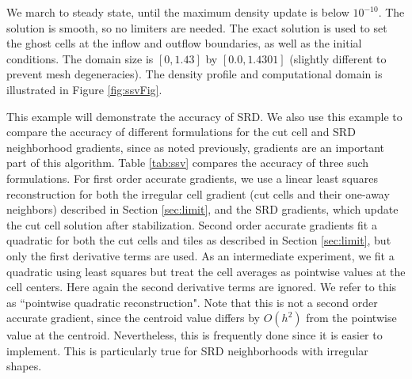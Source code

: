 We march to steady state, until the maximum density update is 
below $10^{-10}$.  
The solution is smooth, so no limiters are needed.
The exact solution is used to set the ghost cells at the inflow and
outflow boundaries, as well as the initial conditions. The domain size is $[0,1.43]$ by $[0.0,1.4301]$ 
(slightly different to prevent mesh  degeneracies).  
The density profile and computational domain is illustrated in Figure
\ref{fig:ssvFig}.


This example will demonstrate the accuracy of SRD.
We also use this example to compare the accuracy of different
formulations for the cut cell and SRD neighborhood  gradients, since
as noted previously, gradients are an important part of this algorithm.
Table \ref{tab:ssv} compares the accuracy of three such formulations.
For first order accurate gradients, we use a linear least squares 
reconstruction for both the irregular cell gradient (cut cells and their one-away neighbors) 
described in Section \ref{sec:limit}, and the SRD gradients, which 
update the cut cell solution after stabilization. Second order accurate 
gradients fit a quadratic for both
the cut cells and tiles as described in Section \ref{sec:limit}, 
but only the first derivative terms are used. 
As an intermediate experiment, we  fit a quadratic using least squares but 
treat the
cell averages as pointwise values at the cell centers. Here again
the second derivative terms are ignored.  We refer to this as ``pointwise
quadratic reconstruction". Note that this is not a
second order accurate gradient, since the centroid value differs by $O(h^2)$
from the pointwise value at the centroid. Nevertheless, this is frequently
done since it is easier to implement. This is particularly true  for SRD
neighborhoods with irregular shapes. 



